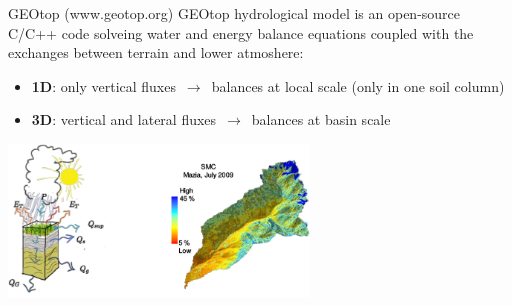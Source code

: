 \documentclass[
  ignorenonframetext,
]{beamer}
\begin{document}
\begin{frame}{GEOtop (www.geotop.org)}
\protect\hypertarget{geotop-www.geotop.org}{}
GEOtop hydrological model is an open-source C/C++ code solveing water
and energy balance equations coupled with the exchanges between terrain
and lower atmoshere:

\begin{itemize}
\item
  \textbf{1D}: only vertical fluxes \(\,\to\,\) balances at local scale
  (only in one soil column)
\item
  \textbf{3D}: vertical and lateral fluxes \(\,\to\,\) balances at basin
  scale
\end{itemize}

\includegraphics[width=0.6\textwidth,height=\textheight]{resources/images/geotop_ET_SWC.png}\\
\end{frame}
\end{document}
